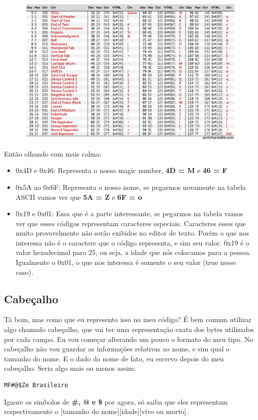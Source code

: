 \documentclass[a4paper,oneside,12pt]{article}
\begin{document}
\begin{figure}[h]
    \centering
    \includegraphics[width=\linewidth]{ASCII.jpg}
\end{figure}

Então olhando com mais calma:
\begin{itemize}
    \item 0x4D e 0x46: Representa o nosso magic number, \textbf{4D = M} e \textbf{46 = F}
    \item 0x5A ao 0x6F: Representa o nosso nome, se pegarmos novamente na tabela ASCII vamos ver que \textbf{5A = Z} e \textbf{6F = o}
    \item 0x19 e 0x01: Essa que é a parte interessante, se pegarmos na tabela vamos ver que esses códigos representam caracteres especiais. Caracteres esses que muito provavelmente não serão exibidos no editor de texto. Porém o que nos interessa não é o caractere que o código representa, e sim seu valor. 0x19 é o valor hexadecimal para 25, ou seja, a idade que nós colocamos para a pessoa. Igualmente o 0x01, o que nos interessa é somente o seu valor (true nesse caso).
\end{itemize}

\subsection{Cabeçalho}

Tá bom, mas como que eu represento isso no meu código? É bem comum utilizar algo chamado cabeçalho, que vai ter uma representação exata dos bytes utilizados por cada campo.
Eu vou começar alterando um pouco o formato do meu tipo. No cabeçalho não vou guardar as informações relativas ao nome, e sim qual o tamanho do nome. E o dado do nome de fato, eu escrevo depois do meu cabeçalho. Seria algo mais ou menos assim:
\begin{lstlisting}
MF#@$Ze Brasileiro
\end{lstlisting}
Ignore os simbolos de \textbf{\#, @ e \$} por agora, só saiba que eles representam respectivamente o [tamanho do nome][idade][vivo ou morto].
\end{document}
